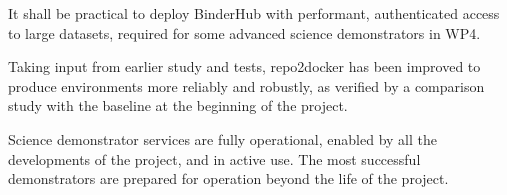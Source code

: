 \begin{milestones}
  {
  It shall be practical to deploy BinderHub with performant, authenticated access to large datasets,
  required for some advanced science demonstrators in WP4.
  }

  {
  Taking input from earlier study and tests,
  repo2docker has been improved to produce environments more reliably and robustly,
  as verified by a comparison study with the baseline at the beginning of the project.
  }

  {
  Science demonstrator services are fully operational, enabled by all the developments of the project,
  and in active use.
  The most successful demonstrators are prepared for operation beyond the life of the project.
  }

\end{milestones}

\milestonetable
